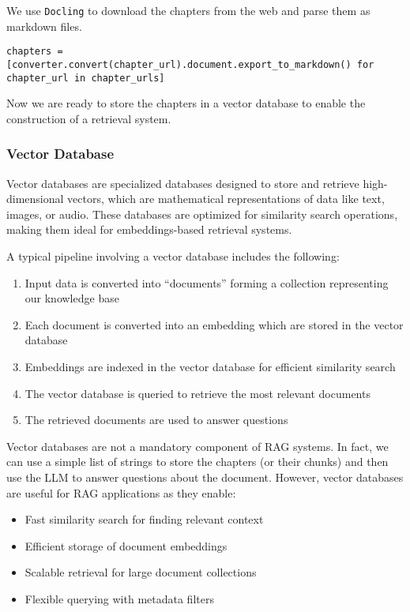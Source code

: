 We use \texttt{Docling} to download the chapters from the web and parse them as markdown files.

\begin{verbatim}
chapters = [converter.convert(chapter_url).document.export_to_markdown() for chapter_url in chapter_urls]
\end{verbatim}
Now we are ready to store the chapters in a vector database to enable the construction of a retrieval system.

\subsubsection{Vector Database}

Vector databases are specialized databases designed to store and retrieve high-dimensional vectors, which are mathematical representations of data like text, images, or audio. These databases are optimized for similarity search operations, making them ideal for embeddings-based retrieval systems.

A typical pipeline involving a vector database includes the following:

\begin{enumerate}
    \item Input data is converted into ``documents'' forming a collection representing our knowledge base
    \item Each document is converted into an embedding which are stored in the vector database
    \item Embeddings are indexed in the vector database for efficient similarity search
    \item The vector database is queried to retrieve the most relevant documents
    \item The retrieved documents are used to answer questions
\end{enumerate}

Vector databases are not a mandatory component of RAG systems. In fact, we can use a simple list of strings to store the chapters (or their chunks) and then use the LLM to answer questions about the document. However, vector databases are useful for RAG applications as they enable:
\begin{itemize}
    \item Fast similarity search for finding relevant context
    \item Efficient storage of document embeddings
    \item Scalable retrieval for large document collections
    \item Flexible querying with metadata filters
\end{itemize}

